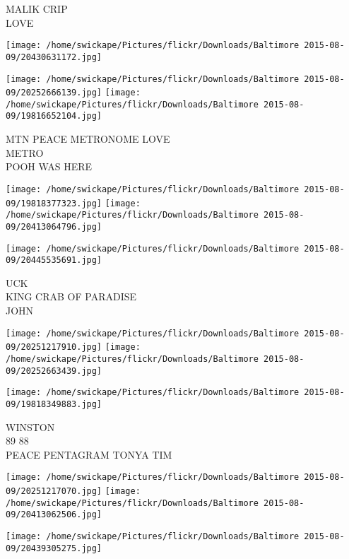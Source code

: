 \documentclass[10pt,letterpaper]{article}
\begin{document}
MALIK CRIP\\
LOVE\\
\pagebreak

\texttt{[image: /home/swickape/Pictures/flickr/Downloads/Baltimore 2015-08-09/20430631172.jpg]}

\vspace{0.25in}
\texttt{[image: /home/swickape/Pictures/flickr/Downloads/Baltimore 2015-08-09/20252666139.jpg]}
\texttt{[image: /home/swickape/Pictures/flickr/Downloads/Baltimore 2015-08-09/19816652104.jpg]}

MTN PEACE METRONOME LOVE\\
METRO\\
POOH WAS HERE\\
\pagebreak

\texttt{[image: /home/swickape/Pictures/flickr/Downloads/Baltimore 2015-08-09/19818377323.jpg]}
\texttt{[image: /home/swickape/Pictures/flickr/Downloads/Baltimore 2015-08-09/20413064796.jpg]}

\vspace{0.25in}
\texttt{[image: /home/swickape/Pictures/flickr/Downloads/Baltimore 2015-08-09/20445535691.jpg]}

UCK\\
KING CRAB OF PARADISE\\
JOHN\\
\pagebreak

\texttt{[image: /home/swickape/Pictures/flickr/Downloads/Baltimore 2015-08-09/20251217910.jpg]}
\texttt{[image: /home/swickape/Pictures/flickr/Downloads/Baltimore 2015-08-09/20252663439.jpg]}

\vspace{0.25in}
\texttt{[image: /home/swickape/Pictures/flickr/Downloads/Baltimore 2015-08-09/19818349883.jpg]}

WINSTON\\
89 88\\
PEACE PENTAGRAM TONYA TIM\\
\pagebreak

\texttt{[image: /home/swickape/Pictures/flickr/Downloads/Baltimore 2015-08-09/20251217070.jpg]}
\texttt{[image: /home/swickape/Pictures/flickr/Downloads/Baltimore 2015-08-09/20413062506.jpg]}

\vspace{0.25in}
\texttt{[image: /home/swickape/Pictures/flickr/Downloads/Baltimore 2015-08-09/20439305275.jpg]}
\end{document}
